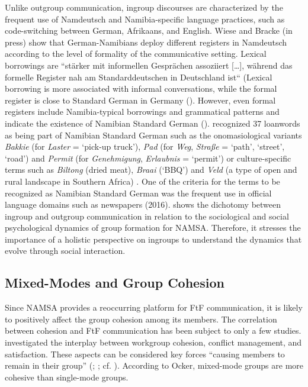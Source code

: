 \documentclass[output=paper]{langsci/langscibook}
\begin{document}
Unlike outgroup communication, ingroup discourses are characterized by the frequent use of Namdeutsch and Namibia-specific language practices, such as code-switching between German, Afrikaans, and English. Wiese and Bracke (in press) show that German-Namibians deploy different registers in Namdeutsch according to the level of formality of the communicative setting. Lexical borrowings are “stärker mit informellen Gesprächen assoziiert […], während das formelle Register nah am Standarddeutschen in Deutschland ist“ (Lexical borrowing is more associated with informal conversations, while the formal register is close to Standard German in Germany (\citealt[14]{wiese_registerdifferenzierung_2021}). However, even formal registers include Namibia-typical borrowings and grammatical patterns and indicate the existence of Namibian Standard German (\citealt{wiese_registerdifferenzierung_2021}). \citet{ammon_variantenworterbuch_2016} recognized 37 loanwords as being part of Namibian Standard German such as the onomasiological variants  \textit{Bakkie} (for \textit{Laster} = ‘pick-up truck’), \textit{Pad} (for   \textit{Weg}, \textit{Straße}  = ‘path’, ‘street’, ‘road’) and \textit{Permit}  (for \textit{Genehmigung}, \textit{Erlaubnis} = ‘permit’) or culture-specific terms such as \textit{Biltong} (dried meat),  \textit{Braai} (‘BBQ’) and \textit{Veld}   (a type of open and rural landscape in Southern Africa) \citep[206--207]{hausler_zur_2017}. One of the criteria for the terms to be recognized as Namibian Standard German was the frequent use in official language domains such as newspapers (2016).  shows the dichotomy between ingroup and outgroup communication in relation to the sociological and social psychological dynamics of group formation for NAMSA. Therefore, it stresses the importance of a holistic perspective on ingroups to understand the dynamics that evolve through social interaction.
  

 
   
\subsection{Mixed-Modes and Group Cohesion}
 \label{sec:radke:3.3}
 

Since NAMSA provides a reoccurring platform for FtF communication, it is likely to positively affect the group cohesion among its members. The correlation between cohesion and FtF communication has been subject to only a few studies. \citet{ocker_mediating_2002} investigated the interplay between workgroup cohesion, conflict management, and satisfaction. These aspects can be considered key forces “causing members to remain in their group” (\citealt[246]{carron_development_1985}; \citealt[276]{brawley_assessing_1987}; cf. \citealt{festinger_social_1950}). According to Ocker, mixed-mode groups are more cohesive than single-mode groups.
\end{document}
